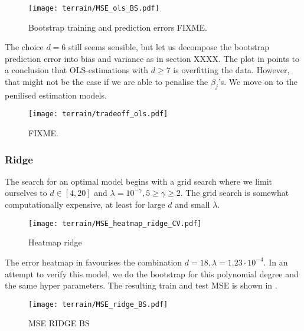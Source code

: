         \begin{figure}
            \texttt{[image: terrain/MSE\_ols\_BS.pdf]}
            \caption{Bootstrap training and prediction errors FIXME.}
            \label{fig:gc_model_complexity_ols}
        \end{figure}

        The choice $d=6$ still seems sensible, but let us decompose the bootstrap prediction error into bias and variance as in section XXXX. The plot in  points to a conclusion that OLS-estimations with $d\geq 7$ is overfitting the data. However, that might not be the case if we are able to penalise the $\beta_j$'s. We move on to the penilised estimation models.

        \begin{figure}
            \texttt{[image: terrain/tradeoff\_ols.pdf]}
            \caption{FIXME.}
            \label{fig:gc_bias_variance_ols}
        \end{figure}


        \subsubsection{Ridge}\label{sec:gc_ridgeanalysis}


        The search for an optimal model begins with a grid search where we limit ourselves to $d\in[4, 20]$ and $\lambda=10^{-\gamma}, 5 \geq \gamma \geq 2$. The grid search is somewhat computationally expensive, at least for large $d$ and small $\lambda$.
        
        \begin{figure}
            \texttt{[image: terrain/MSE\_heatmap\_ridge\_CV.pdf]}
            \caption{Heatmap ridge}
            \label{fig:gc_gridsearch_ridge}
        \end{figure}

        The error heatmap in  favourises the combination $d=18, \lambda = 1.23\cdot 10^{-4}$. In an attempt to verify this model, we do the bootstrap for this polynomial degree and the same hyper parameters. The resulting train and test MSE is shown in .

        \begin{figure}
            \texttt{[image: terrain/MSE\_ridge\_BS.pdf]}
            \caption{MSE RIDGE BS}
            \label{fig:gc_model_complexity_ridge}
        \end{figure}

